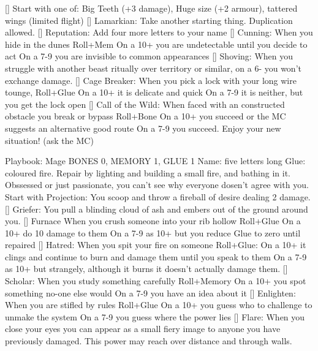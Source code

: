 [] Start with one of: Big Teeth (+3 damage), Huge size (+2 armour), tattered wings (limited flight)
[] Lamarkian: Take another starting thing. Duplication allowed.
[] Reputation: Add four more letters to your name
[] Cunning: When you hide in the dunes Roll+Mem
On a 10+ you are undetectable until you decide to act
On a 7-9 you are invisible to common appearances
[] Shoving: When you struggle with another beast ritually over territory or similar, on a 6- you won't exchange damage.
[] Cage Breaker: When you pick a lock with your long wire tounge, Roll+Glue
On a 10+ it is delicate and quick
On a 7-9 it is neither, but you get the lock open
[] Call of the Wild: When faced with an constructed obstacle you break or bypass Roll+Bone
On a 10+ you succeed or the MC suggests an alternative good route
On a 7-9 you succeed. Enjoy your new situation! (ask the MC)




Playbook: Mage
BONES 0, MEMORY 1, GLUE 1  
Name: five letters long
Glue: coloured fire. Repair by lighting and building a small fire, and bathing in it.
Obssessed or just passionate, you can't see why everyone dosen't agree with you.
Start with Projection: You scoop and throw a fireball of desire dealing 2 damage.
[] Griefer: You pull a blinding cloud of ash and embers out of the ground around you.
[] Furnace When you crush someone into your rib hollow Roll+Glue
On a 10+ do 10 damage to them
On a 7-9 as 10+ but you reduce Glue to zero until repaired
[] Hatred: When you spit your fire on someone Roll+Glue:
On a 10+ it clings and continue to burn and damage them until you speak to them
On a 7-9 as 10+ but strangely, although it burns it doesn't actually damage them.
[] Scholar: When you study something carefully Roll+Memory
On a 10+ you spot something no-one else would
On a  7-9 you have an idea about it
[] Enlighten: When you are stifled by rules Roll+Glue
On a 10+ you guess who to challenge to unmake the system
On a 7-9 you guess where the power lies
[] Flare: When you close your eyes you can appear as a small fiery image to anyone you have previously damaged. This power may reach over distance and through walls.

